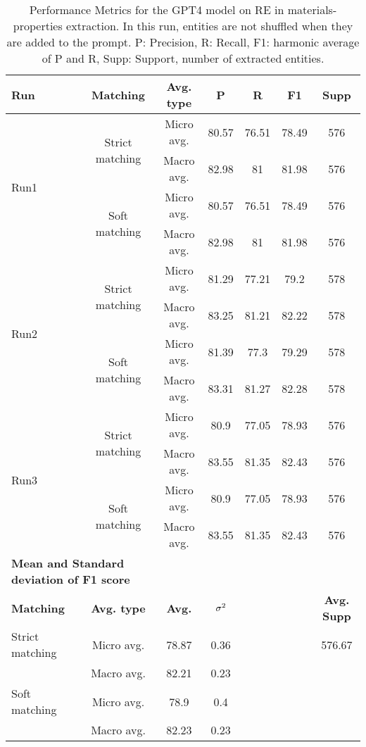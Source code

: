 
\begin{table}[htbp]
    \small
    \centering
    \caption{Performance Metrics for the GPT4 model on RE in materials-properties extraction. In this run, entities are not shuffled when they are added to the prompt. P: Precision, R: Recall, F1: harmonic average of P and R, Supp: Support, number of extracted entities.}
    \begin{tabular}{lcccccc}
        \toprule
        \textbf{Run} & \textbf{Matching} & \textbf{Avg. type} & \textbf{P} & \textbf{R} & \textbf{F1} & \textbf{Supp} \\
        \midrule
        \multirow{4}{*}{Run1} & \multirow{2}{*}{Strict matching} & Micro avg. & 80.57 & 76.51 & 78.49 & 576 \\
        & & Macro avg. & 82.98 & 81 & 81.98 & 576 \\
        \cmidrule{2-7}
        & \multirow{2}{*}{Soft matching} & Micro avg. & 80.57 & 76.51 & 78.49 & 576 \\
        & & Macro avg. & 82.98 & 81 & 81.98 & 576 \\
        \midrule
        \multirow{4}{*}{Run2} & \multirow{2}{*}{Strict matching} & Micro avg. & 81.29 & 77.21 & 79.2 & 578 \\
        & & Macro avg. & 83.25 & 81.21 & 82.22 & 578 \\
        \cmidrule{2-7}
        & \multirow{2}{*}{Soft matching} & Micro avg. & 81.39 & 77.3 & 79.29 & 578 \\
        & & Macro avg. & 83.31 & 81.27 & 82.28 & 578 \\
        \midrule
        \multirow{4}{*}{Run3} & \multirow{2}{*}{Strict matching} & Micro avg. & 80.9 & 77.05 & 78.93 & 576 \\
        & & Macro avg. & 83.55 & 81.35 & 82.43 & 576 \\
        \cmidrule{2-7}
        & \multirow{2}{*}{Soft matching} & Micro avg. & 80.9 & 77.05 & 78.93 & 576 \\
        & & Macro avg. & 83.55 & 81.35 & 82.43 & 576 \\
        \midrule
        \multicolumn{2}{l}{\textbf{Mean and Standard deviation of F1 score}} & & & & & \\
        \midrule
        \textbf{Matching} & \textbf{Avg. type} & \textbf{Avg.} & $\sigma\textsuperscript{2}$ & & & \textbf{Avg. Supp}\\
        Strict matching & Micro avg. & 78.87 & 0.36 & & & 576.67 \\
        & Macro avg. & 82.21 & 0.23 & & & \\
        Soft matching & Micro avg. & 78.9 & 0.4 & & \\
        & Macro avg. & 82.23 & 0.23 & & \\
        \bottomrule
    \end{tabular}
\end{table}


